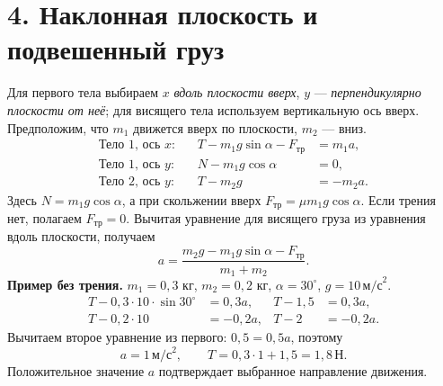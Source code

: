 \documentclass[a4paper,12pt]{article}
\newcommand{\mys}[1]{\section*{\textcolor{darkaccent}{#1}}\vspace{-7pt}\noindent{\color{accent}\rule{\linewidth}{0.4pt}}\par\vspace{2pt}}
\newcommand{\nterm}{\,\text{Н}}
\newcommand{\aunit}{\,\text{м/с}^{2}}
\begin{document}
\clearpage
\mys{4. Наклонная плоскость и подвешенный груз}
\begin{center}
\end{center}
Для первого тела выбираем $x$ \emph{вдоль плоскости вверх}, $y$ --- \emph{перпендикулярно плоскости от неё}; для висящего тела используем вертикальную ось вверх. Предположим, что $m_1$ движется вверх по плоскости, $m_2$ --- вниз.
\[
\begin{aligned}
\text{Тело 1, ось }x:&&T-m_1g\sin\alpha-F_{\text{тр}}&=m_1a,\\
\text{Тело 1, ось }y:&&N-m_1g\cos\alpha&=0,\\
\text{Тело 2, ось }y:&&T-m_2g&=-m_2a.
\end{aligned}
\]
Здесь $N=m_1g\cos\alpha$, а при скольжении вверх $F_{\text{тр}}=\mu m_1g\cos\alpha$. Если трения нет, полагаем $F_{\text{тр}}=0$. Вычитая уравнение для висящего груза из уравнения вдоль плоскости, получаем
\[
 a=\frac{m_2g-m_1g\sin\alpha-F_{\text{тр}}}{m_1+m_2}.
\]
\textcolor{darkaccent}{\textbf{Пример без трения.}} $m_1=0{,}3$ кг, $m_2=0{,}2$ кг, $\alpha=30^\circ$, $g=10\aunit$.
\[
\begin{aligned}
 T-0{,}3\cdot10\cdot\sin30^\circ&=0{,}3a, &T-1{,}5&=0{,}3a,\\
 T-0{,}2\cdot10&=-0{,}2a, &T-2&=-0{,}2a.
\end{aligned}
\]
Вычитаем второе уравнение из первого: $0{,}5=0{,}5a$, поэтому
\[
\boxed{a=1\aunit},\qquad
\boxed{T=0{,}3\cdot1+1{,}5=1{,}8\nterm}.
\]
Положительное значение $a$ подтверждает выбранное направление движения.
\end{document}

